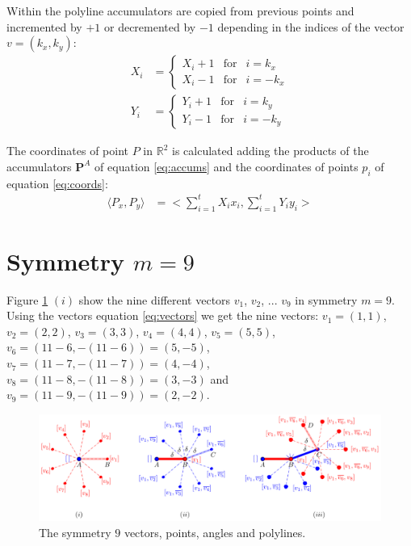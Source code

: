 \documentclass[11pt]{article}
\begin{document}
Within the polyline accumulators are copied from previous points and incremented by $+1$ or decremented by $-1$ depending in the indices of the vector $v = (k_x,k_y)$:
\begin{align}
X_i &= \left\{ \begin{array}{ccl}
 X_i + 1 & \mbox{for} & i = k_x \\
 X_i - 1 & \mbox{for} & i = -k_x
 \end{array}\right. \\
Y_i &= \left\{ \begin{array}{ccl}
 Y_i + 1 & \mbox{for} & i = k_y \\
 Y_i - 1 & \mbox{for} & i = -k_y
 \end{array}\right.
\end{align}

The coordinates of point $P$ in $\mathbb{R}^2$ is calculated adding the products of the accumulators $\textbf{P}^A$ of equation \ref{eq:accums} and the coordinates of points $p_i$ of equation \ref{eq:coords}:
\begin{align}
\langle P_x,P_y\rangle &= 
 \biggl< \sum_{i=1}^{t}X_ix_i, \sum_{i=1}^{t}Y_iy_i \biggr> \label{eq:absolute}
\end{align}




\section{Symmetry $m=9$}

Figure \ref{fig:vectors-a} $(i)$ show the nine different vectors $v_1$, $v_2$, ... $v_9$ in symmetry $m=9$. Using the vectors equation \ref{eq:vectors} we get the nine vectors:
$v_1 = (1,1)$,
$v_2 = (2,2)$,
$v_3 = (3,3)$,
$v_4 = (4,4)$,
$v_5 = (5,5)$,
$v_6 = (11-6,-(11-6)) = (5,-5)$,
$v_7 = (11-7,-(11-7)) = (4,-4)$,
$v_8 = (11-8,-(11-8)) = (3,-3)$ and
$v_9 = (11-9,-(11-9)) = (2,-2)$.

\begin{figure}[H]
\centering
\includegraphics[scale=1]{vectors-a}
\caption{The symmetry $9$ vectors, points, angles and polylines.}
\label{fig:vectors-a}
\end{figure}
\end{document}
